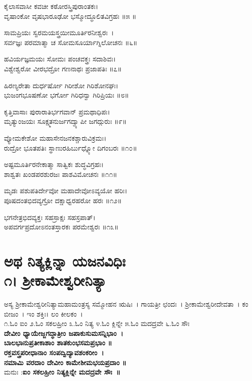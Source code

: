 ಕೈಲಾಸವಾಸೀ ಕವಚೀ ಕಠೋರಸ್ತ್ರಿಪುರಾಂತಕಃ।\\
ವೃಷಾಂಕೋ ವೃಷಭಾರೂಢೋ ಭಸ್ಮೋದ್ಧೂಲಿತವಿಗ್ರಹಃ ॥೫ ॥

ಸಾಮಪ್ರಿಯಃ ಸ್ವರಮಯಸ್ತ್ರಯೀಮೂರ್ತಿರನೀಶ್ವರಃ~।\\
ಸರ್ವಜ್ಞಃ ಪರಮಾತ್ಮಾ ಚ ಸೋಮಸೂರ್ಯಾಗ್ನಿಲೋಚನಃ ॥೬॥

ಹವಿರ್ಯಜ್ಞಮಯಃ ಸೋಮಃ ಪಂಚವಕ್ತ್ರಃ ಸದಾಶಿವಃ।\\
ವಿಶ್ವೇಶ್ವರೋ ವೀರಭದ್ರೋ ಗಣನಾಥಃ ಪ್ರಜಾಪತಿಃ ॥೭॥

ಹಿರಣ್ಯರೇತಾ ದುರ್ಧರ್ಷೋ ಗಿರೀಶೋ ಗಿರಿಶೋನಘಃ।\\
ಭುಜಂಗಭೂಷಣೋ ಭರ್ಗೋ ಗಿರಿಧನ್ವಾ ಗಿರಿಪ್ರಿಯಃ ॥೮॥

ಕೃತ್ತಿವಾಸಾಃ ಪುರಾರಾತಿರ್ಭಗವಾನ್ ಪ್ರಮಥಾಧಿಪಃ।\\
ಮೃತ್ಯುಂಜಯಃ ಸೂಕ್ಷ್ಮತನುರ್ಜಗದ್ವ್ಯಾಪೀ ಜಗದ್ಗುರುಃ ॥೯॥

ವ್ಯೋಮಕೇಶೋ ಮಹಾಸೇನಜನಕಶ್ಚಾರುವಿಕ್ರಮಃ।\\
ರುದ್ರೋ ಭೂತಪತಿಃ ಸ್ಥಾಣುರಹಿರ್ಬುಧ್ನ್ಯೋ ದಿಗಂಬರಃ ॥೧೦॥

ಅಷ್ಟಮೂರ್ತಿರನೇಕಾತ್ಮಾ ಸಾತ್ವಿಕಃ ಶುದ್ಧವಿಗ್ರಹಃ।\\
ಶಾಶ್ವತಃ ಖಂಡಪರಶುರಜಃ ಪಾಶವಿಮೋಚನಃ ॥೧೧॥

ಮೃಡಃ ಪಶುಪತಿರ್ದೇವೋ ಮಹಾದೇವೋಽವ್ಯಯೋ ಹರಿಃ।\\
ಪೂಷದಂತಭಿದವ್ಯಗ್ರೋ ದಕ್ಷಾಧ್ವರಹರೋ ಹರಃ ॥೧೨॥

ಭಗನೇತ್ರಭಿದವ್ಯಕ್ತಃ ಸಹಸ್ರಾಕ್ಷಃ ಸಹಸ್ರಪಾತ್।\\
ಅಪವರ್ಗಪ್ರದೋಽನಂತಸ್ತಾರಕಃ ಪರಮೇಶ್ವರಃ ॥೧೩॥

\section{ಅಥ ನಿತ್ಯಕ್ಲಿನ್ನಾ ಯಜನವಿಧಿಃ\\೧। ಶ್ರೀಕಾಮೇಶ್ವರೀನಿತ್ಯಾ}
ಅಸ್ಯ ಶ್ರೀಕಾಮೇಶ್ವರೀನಿತ್ಯಾಮಹಾಮಂತ್ರಸ್ಯ ಸಮ್ಮೋಹನ ಋಷಿಃ~। ಗಾಯತ್ರೀ ಛಂದಃ~। ಶ್ರೀಕಾಮೇಶ್ವರೀದೇವತಾ~। ಕಂ ಬೀಜಂ~। ಇಂ ಶಕ್ತಿಃ। ಲಂ ಕೀಲಕಂ~।\\
೧.ಓಂ ಐಂ ೨.ಓಂ ಸಕಲಹ್ರೀಂ ೩.ಓಂ ನಿತ್ಯ  ೪.ಓಂ ಕ್ಲಿನ್ನೇ ೫.ಓಂ ಮದದ್ರವೇ ೬.ಓಂ ಸೌಃ \\
{\bfseries ದೇವೀಂ ಧ್ಯಾಯೇಜ್ಜಗದ್ಧಾತ್ರೀಂ ಜಪಾಕುಸುಮಸನ್ನಿಭಾಂ~।\\
ಬಾಲಭಾನುಪ್ರತೀಕಾಶಾಂ ಶಾತಕುಂಭಸಮಪ್ರಭಾಂ ॥\\
ರಕ್ತವಸ್ತ್ರಪರೀಧಾನಾಂ ಸಂಪದ್ವಿದ್ಯಾವಶಂಕರೀಂ~।\\
ನಮಾಮಿ ವರದಾಂ ದೇವೀಂ ಕಾಮೇಶೀಮಭಯಪ್ರದಾಂ ॥\\}
ಮನುಃ :{\bfseries  ಐಂ ಸಕಲಹ್ರೀಂ ನಿತ್ಯಕ್ಲಿನ್ನೇ ಮದದ್ರವೇ ಸೌಃ~॥}

